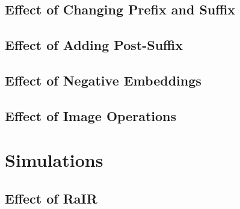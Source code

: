 \subsection{Effect of Changing Prefix and Suffix}
\label{sec:prefix-suffix}


\subsection{Effect of Adding Post-Suffix}
\label{sec:post-suffix}

\subsection{Effect of Negative Embeddings}
\label{sec:negative-embeddings}


\subsection{Effect of Image Operations}
\label{sec:image-operations}



\section{Simulations}
\label{sec:simulations}


\subsection{Effect of RaIR}
\label{sec:effect-rair}
